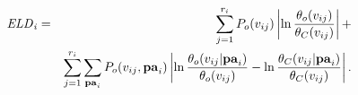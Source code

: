 	\begin{eqnarray}
	\it{ELD}_{i} & = & \sum_{j=1}^{r_{i}} P_{o}(v_{ij}) \left|\ln \frac{\theta_{o}( v_{ij})}{\theta_{C}( v_{ij})}\right|+ \label{eq:fd}\\
	& & \sum_{j=1}^{r_{i}} \sum_{\mathbf{pa}_{i}} 
	P_{o}( v_{ij},\mathbf{pa}_{i})
	\left|\ln \frac{\theta_{o}( v_{ij}|\mathbf{pa}_{i})}{\theta_{o}(v_{ij})} - \ln \frac{\theta_{C}( v_{ij}|\mathbf{pa}_{i})}{\theta_{C}(v_{ij})}\right|. \label{eq:mi}
	\end{eqnarray}
	
	
